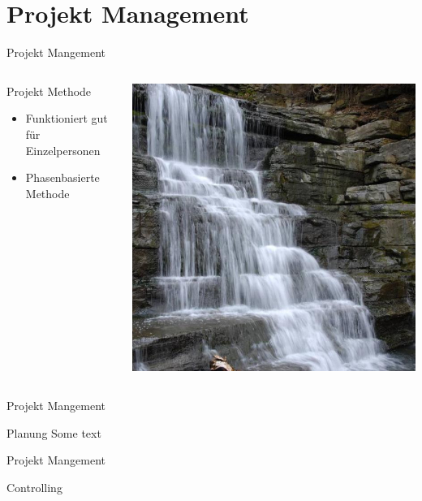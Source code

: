 \documentclass[aspectratio=1610]{beamer}
\begin{document}
\section{Projekt Management}
\label{sec:org63927d5}
\begin{frame}[label={sec:org900c9bb}]{Projekt Mangement}
\begin{columns}
\begin{column}{0.5\columnwidth}
\alert{Projekt Methode}
\begin{itemize}
\item <2-> Funktioniert gut für Einzelpersonen
\item <3-> Phasenbasierte Methode
\end{itemize}
\end{column}

\begin{column}{0.5\columnwidth}
\begin{center}
\includegraphics[width=.8\linewidth]{pictures/waterfall_stairs.jpg}
\end{center}
\end{column}
\end{columns}
\end{frame}

\begin{frame}[label={sec:org3edc69c}]{Projekt Mangement}
\begin{block}{Planung}
Some text
\end{block}
\end{frame}

\begin{frame}[label={sec:org8eae014}]{Projekt Mangement}
\begin{block}{Controlling}
\end{block}
\end{frame}
\end{document}
